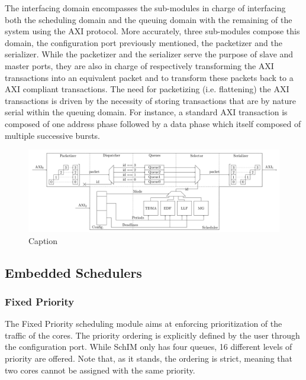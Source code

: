        The interfacing domain encompasses the sub-modules in charge of interfacing both the scheduling domain and the queuing domain with the remaining of the system using the AXI protocol.
        More accurately, three sub-modules compose this domain, the configuration port previously mentioned, the packetizer and the serializer.
        While the packetizer and the serializer serve the purpose of slave and master ports, they are also in charge of respectively transforming the AXI transactions into an equivalent packet and to transform these packets back to a AXI compliant transactions.
        The need for packetizing (i.e. flattening) the AXI transactions is driven by the necessity of storing transactions that are by nature serial within the queuing domain.
        For instance, a standard AXI transaction is composed of one address phase followed by a data phase which itself composed of multiple successive bursts.

        \begin{figure}
            \centering
            \includegraphics[scale=0.08]{images/MemorEDF_module_schema.png}
            \caption{Caption}
            \label{fig:MemorEDF_module_schema}
        \end{figure}
        
    \subsection{Embedded Schedulers}
        
        \subsubsection{Fixed Priority}
            The Fixed Priority scheduling module aims at enforcing prioritization of the traffic of the cores. The priority ordering is explicitly defined by the user through the configuration port. While SchIM only has four queues, 16 different levels of priority are offered. Note that, as it stands, the ordering is strict, meaning that two cores cannot be assigned with the same priority.
          
